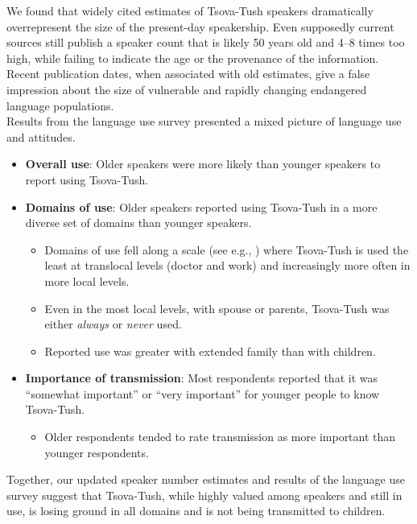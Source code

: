 \documentclass[portrait,fontscale=0.285,a0paper]{baposter2}
\newcommand{\compresslist}{ %
\setlength{\itemsep}{1pt}
\setlength{\parskip}{0pt}
\setlength{\parsep}{0pt}
}
\begin{document}
\begin{poster}
{\begin{singlespace}{\footnotesize
We found that widely cited estimates of Tsova-Tush speakers dramatically overrepresent the size of the present-day speakership. Even supposedly current sources still publish a speaker count that is likely 50 years old and 4--8 times too high, while failing to indicate the age or the provenance of the information. Recent publication dates, when associated with old estimates, give a false impression about the size of vulnerable and rapidly changing endangered language populations.\\ 



\vspace{-0.1in}Results from the language use survey presented a mixed picture of language use and attitudes. }\end{singlespace}
{\footnotesize
\begin{itemize}[leftmargin=*]\compresslist
\item \textbf{Overall use}: Older speakers were more likely than younger speakers to report using Tsova-Tush.
\item \textbf{Domains of use}: Older speakers reported using Tsova-Tush in a more diverse set of domains than younger speakers.
\begin{itemize}\compresslist
\item Domains of use fell along a scale (see e.g., \citealt{blommaertsociolinguistic2007}) where Tsova-Tush is used the least at translocal levels (doctor and work) and increasingly more often in more local levels. 
\item Even in the most local levels, with spouse or parents, Tsova-Tush was either \textit{always} or \textit{never} used.
\item Reported use was greater with extended family than with children.
\end{itemize}
\item \textbf{Importance of transmission}: Most respondents reported that it was ``somewhat important” or ``very important” for younger people to know Tsova-Tush.
\begin{itemize}\compresslist
\item Older respondents tended to rate transmission as more important than younger respondents.
\end{itemize}
\end{itemize}
}

{\footnotesize \begin{singlespace}Together, our updated speaker number estimates and results of the language use survey suggest that Tsova-Tush, while highly valued among speakers and still in use, is losing ground in all domains and is not being transmitted to children.\end{singlespace}}



}
\end{poster}
\end{document}

